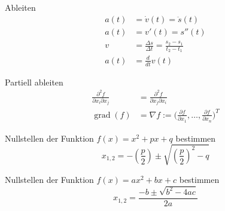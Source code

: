 \documentclass[12pt,a5paper]{book}
\DeclareMathOperator{\grad}{grad}
\begin{document}
Ableiten
\begin{align}
a(t) &= \dot{v}(t) = \ddot{s}(t)  \\
a(t) &= v'(t) = s''(t)  \\
v &= \frac{\Delta s}{\Delta t} = \frac{s_2 - s_1}{t_2 - t_1} \\
a(t) &= \frac{d}{dt} v(t)
\end{align}

Partiell ableiten
\begin{align}
\frac{\partial^{2}f}{\partial x_i \partial x_j} &= \frac{\partial^{2}f}{\partial x_j \partial x_i} \\
\grad(f) &= \nabla f:=  \Biggl( \frac{\partial f}{\partial x_1}, \ldots, \frac{\partial f}{\partial x_n} \Biggr)^T
\end{align}

Nullstellen der Funktion $f(x) = x^2 + px + q$ bestimmen
\begin{equation}
x_{1,2} = - \left( \frac{p}{2} \right) \pm \sqrt{ \left( \frac{p}{2}\right) ^2 - q}
\end{equation}

Nullstellen der Funktion $f(x) = ax^2 + bx + c$ bestimmen
\begin{equation}
x_{1,2} = \frac{-b \pm \sqrt{b^2-4ac}}{2a}
\end{equation}
\end{document}
